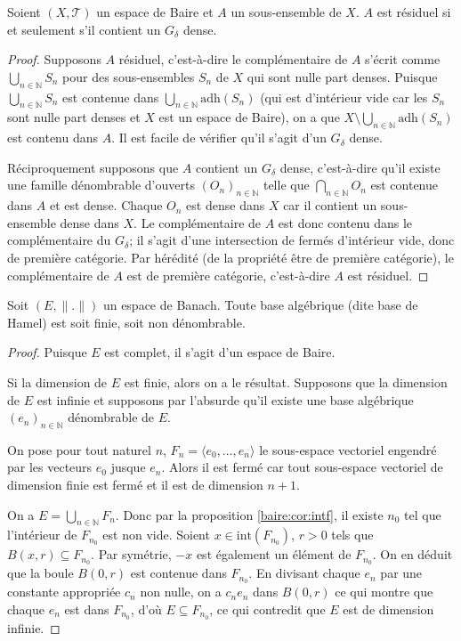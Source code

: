 \begin{prop}
  Soient $(X, \mathcal{T})$ un espace de Baire et $A$ un sous-ensemble
  de $X$. $A$ est résiduel si et seulement s'il contient un $G_\delta$
  dense.
\end{prop}

\begin{proof}
  Supposons $A$ résiduel, c'est-à-dire le complémentaire de $A$
  s'écrit comme $\bigcup_{n\in\mathbb N} S_n$ pour des sous-ensembles
  $S_n$ de $X$ qui sont nulle part denses. Puisque $\bigcup_{n\in\mathbb N} S_n$
  est contenue dans $\bigcup_{n\in\mathbb N} \mathrm{adh}(S_n)$ (qui est d'intérieur
  vide car les $S_n$ sont nulle part denses et $X$ est un espace de Baire),
  on a que $X\setminus \bigcup_{n\in\mathbb N} \mathrm{adh}(S_n)$ est contenu
  dans $A$. Il est facile de vérifier qu'il s'agit d'un $G_\delta$ dense.

  Réciproquement supposons que $A$ contient un $G_\delta$ dense, c'est-à-dire
  qu'il existe une famille dénombrable d'ouverts $(O_n)_{n\in\mathbb N}$ telle
  que $\bigcap_{n\in\mathbb N}O_n$ est contenue dans $A$ et est dense. Chaque
  $O_n$ est dense dans $X$ car il contient un sous-ensemble dense dans $X$.
  Le complémentaire de $A$ est donc contenu dans le complémentaire du
  $G_\delta$; il s'agit d'une intersection de fermés d'intérieur vide, donc
  de première catégorie. Par hérédité
  (de la propriété \og être de première catégorie\fg), le complémentaire
  de $A$ est de première catégorie, c'est-à-dire $A$ est résiduel.
\end{proof}

\begin{prop}\label{baire:base}
  Soit $(E, \|.\|)$ un espace de Banach. Toute base algébrique
  (dite base de Hamel) est soit finie, soit non dénombrable.
\end{prop}

\begin{proof}
  Puisque $E$ est complet, il s'agit d'un espace de Baire.

  Si la dimension de $E$ est finie, alors on a le résultat.
  Supposons que la dimension de $E$ est infinie et supposons
  par l'absurde qu'il existe une base algébrique $(e_n)_{n\in\mathbb N}$
  dénombrable de $E$.

  On pose pour tout naturel $n$, $F_n = \langle e_0, \ldots, e_n\rangle$ le
  sous-espace vectoriel engendré par les vecteurs $e_0$ jusque $e_n$.
  Alors il est fermé car tout sous-espace vectoriel de dimension finie
  est fermé et il est de dimension $n+1$.

  On a $E = \bigcup_{n\in\mathbb N} F_n$. Donc par la proposition
  \ref{baire:cor:intf}, il existe $n_0$ tel que l'intérieur de
  $F_{n_0}$ est non vide. Soient $x\in \mathrm{int}(F_{n_0})$, $r > 0$
  tels que $B(x, r)\subseteq F_{n_0}$. Par symétrie, $-x$
  est également un élément de $F_{n_0}$. On en déduit que la boule
  $B(0, r)$ est contenue dans $F_{n_0}$. En divisant chaque $e_n$
  par une constante appropriée $c_n$ non nulle, on a $c_n e_n$
  dans $B(0, r)$ ce qui montre que chaque $e_n$ est dans $F_{n_0}$,
  d'où $E \subseteq F_{n_0}$, ce qui contredit que $E$ est de dimension infinie.
\end{proof}

